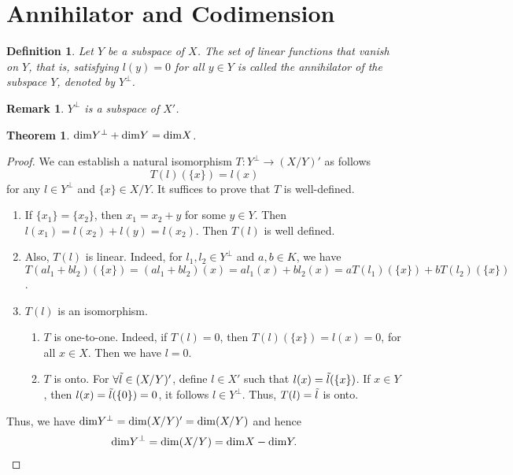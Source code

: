 \documentclass[11pt]{book}
\newtheorem{definition}{Definition}[section]
\newtheorem{theorem}{Theorem}[section]
\newtheorem{remark}{Remark}[section]
\theoremstyle{definition}
\numberwithin{equation}{subsection}
\begin{document}
\medskip

\section{Annihilator and Codimension}
\begin{definition}
Let $Y$ be a subspace of $X$. The set of linear functions that vanish on $Y$, that is, satisfying $l(y) = 0$ for all $y\in Y$ is called the annihilator of the subspace $Y$, denoted by $Y^\bot$.
\end{definition}
\begin{remark}
$Y^\bot$ is a subspace of $X'$.
\end{remark}

\medskip

\begin{theorem}
${\rm dim}Y^\bot + {\rm dim}Y = {\rm dim}X$.
\end{theorem}
\begin{proof}
We can establish a natural isomorphism $T:Y^\bot\to (X/Y)'$ as follows $$T(l)(\{x\}) = l(x)$$
for any $l\in Y^\bot$ and $\{x\}\in X/Y$. It suffices to prove that $T$ is well-defined.
\begin{enumerate}[label=(\arabic*)]
    \item If $\{x_1\} = \{x_2\}$, then $x_1 = x_2 + y$ for some $y\in Y$. Then $l(x_1) = l(x_2) + l(y) = l(x_2)$. Then $T(l)$ is well defined.
    \item Also, $T(l)$ is linear. Indeed, for $l_1, l_2\in Y^\bot$ and $a,b \in K$, we have $T(al_1 + bl_2)(\{x\}) = (al_1 + bl_2)(x) = a l_1(x) + bl_2(x) = a T(l_1)(\{x\}) + b T(l_2)(\{x\})$.
    \item $T(l)$ is an isomorphism. 
    \begin{enumerate}
        \item $T$ is one-to-one. Indeed, if $T(l) = 0$, then $T(l)(\{x\}) = l(x) = 0$, for all $x\in X$. Then we have $l = 0$.
        \item $T$ is onto. For $\forall \Tilde{l}\in (X/Y)'$, define $l\in X'$ such that $l(x) = \Tilde{l}(\{x\})$. If $x\in Y$, then $l(x) = \Tilde{l}(\{0\}) = 0$, it follows $l\in Y^\bot$. Thus, $T(l) = \Tilde{l}$ is onto.
    \end{enumerate}
\end{enumerate}

Thus, we have ${\rm dim}Y^\bot = {\rm dim}(X/Y)' = {\rm dim}(X/Y)$ and hence 
\begin{align*}
    {\rm dim}Y^\bot = {\rm dim}(X/Y) = {\rm dim}X - {\rm dim}Y.
\end{align*}
\end{proof}
\end{document}
